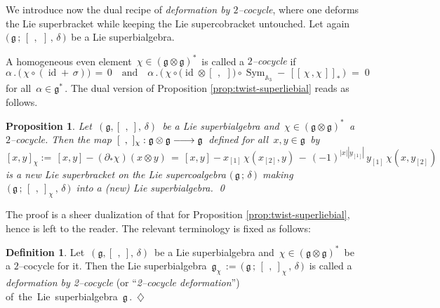 \documentclass[12pt,reqno,twoside,a4paper]{amsart}
\numberwithin{equation}{section}
\newtheorem{prop}[lema]{Proposition}
\theoremstyle{definition}
\newtheorem{definition}[lema]{Definition}
\newtheorem{free text}[lema]{}
\theoremstyle{remark}
\newcommand \id{\operatorname{id}}
\newcommand \Sym{\operatorname{Sym}}
\newcommand{\ot}{\otimes}
\def \lieg{\mathfrak{g}}
\theoremstyle{plain}
\begin{document}
   We introduce now the dual recipe of  \textit{deformation by  $ 2 $--cocycle},
   where one deforms the Lie superbracket while keeping the Lie supercobracket untouched.
   Let again  $ \big(\, \lieg \, ; \, [\,\ ,\,\ ] \, , \, \delta \,\big) \, $  be a Lie superbialgebra.
                                                           \par
   A homogeneous even element  $ \, \chi \in {(\lieg \otimes \lieg)}^* \, $  is called a  \textit{$ 2 $--cocycle\/}  if
%
\begin{equation}  \label{eq: 2-cocycle-cond_Lie-superbialg}
   \alpha\,.\,\big(\, \chi \circ (\id + \, \sigma )\big)  \, = \,  0
     \quad  \text{and}  \quad
   \alpha\,.\,\big(\, \chi \circ \big( \id \otimes [\,\ ,\,\ ] \big) \circ \Sym_{\mathbb{A}_{3}} - \, [\![\, \chi \, , \chi \,]\!]_* \,\big)  \; = \;  0  \;\;
%
\end{equation}
%
 for all  $ \, \alpha \in \lieg^* \, $.  The dual version of
 Proposition \ref{prop:twist-superliebial}  reads as follows.

\vskip11pt

\begin{prop}  \label{prop:cocycle-superliebial}
%
 Let  $ \, (\lieg, [\,\ ,\ ],\, \delta) \, $  be a Lie superbialgebra and
 $ \, \chi \in (\lieg \otimes \lieg)^{*} \, $  a  $ 2 $--cocycle.  Then the map
 $ \, [\,\ ,\ ]_{\chi} : \lieg \ot \lieg \relbar\joinrel\longrightarrow  \lieg \, $
 defined for all  $ \, x , y \in \lieg \, $  by
%
\begin{equation}  \label{eq: def_cocycle-bracket}
%
  [x,y ]_{\chi} := \, [x,y] - (\partial_{*} \chi)(x\ot y)\, =
  \, [x,y] - x_{[1]} \, \chi(x_{[2]},y) \, - \, {(-1)}^{|x| |y_{[1]}|} \, y_{[1]} \, \chi(x,y_{[2]})
%
\end{equation}
%
 is a new Lie superbracket on the Lie supercoalgebra
 $ \big(\, \lieg \, ; \, \delta\,\big) \, $  making
 $ \, \big(\, \lieg \, ; \, [\,\ ,\ ]_{\chi} \, , \, \delta \,\big) \, $  into a (new) Lie superbialgebra.
%
\qed
%
\end{prop}

\vskip7pt

   The proof is a sheer dualization of that for  Proposition \ref{prop:twist-superliebial},
   hence is left to the reader.  The relevant terminology is fixed as follows:

\vskip11pt

\begin{definition}  \label{def: cocyc-deform_Lie-superbialg's}
%
 Let  $ \, (\lieg, [\,\ ,\ ],\, \delta) \, $  be a Lie superbialgebra and
 $ \, \chi \in (\lieg \otimes \lieg)^* \, $  be a  $ 2 $--cocycle for it.
 Then the Lie superbialgebra  $ \, \lieg_\chi \, := \, \big(\, \lieg \, ; \, {[\,\ ,\ ]}_\chi \, , \, \delta \,\big) \, $
 is called a  \textit{defor\-mation by 2--cocycle}  (or  ``\textit{2--cocycle deformation\/}'')
    \hbox{of the Lie superbialgebra  $ \lieg \, $.   \hskip17pt \hfill  $ \diamondsuit $}
%
\end{definition}
\end{document}
